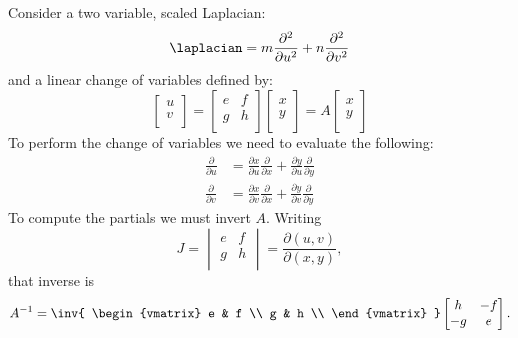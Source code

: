 Consider a two variable, scaled Laplacian:
%
\begin{equation}
\laplacian = m \frac{\partial^2}{\partial u^2} + n \frac{\partial^2}{\partial v^2}
\end{equation}
%
and a linear change of variables defined by:
%
\begin{equation}
\begin{bmatrix}
u \\
v \\
\end{bmatrix}
=
\begin{bmatrix}
e & f \\
g & h \\
\end{bmatrix}
\begin{bmatrix}
x \\
y \\
\end{bmatrix}
=
A
\begin{bmatrix}
x \\
y \\
\end{bmatrix}
\end{equation}
%
To perform the change of variables we need to evaluate the following:
%
\begin{equation}\label{eqn:lorentz:260}
\begin{aligned}
\frac{\partial}{\partial u}
&= \frac{\partial x}{\partial u} \frac{\partial}{\partial x} + \frac{\partial y}{\partial u} \frac{\partial}{\partial y} \\
\frac{\partial}{\partial v}
&= \frac{\partial x}{\partial v} \frac{\partial}{\partial x} + \frac{\partial y}{\partial v} \frac{\partial}{\partial y}
\end{aligned}
\end{equation}
%
To compute the partials we must invert \(A\).  Writing
%
\begin{equation}\label{eqn:lorentz:40}
J =
\begin{vmatrix}
e & f \\
g & h \\
\end{vmatrix}
=
\frac{\partial(u,v)}{\partial(x,y)},
\end{equation}
%
that inverse is
%
\begin{equation}\label{eqn:lorentz:60}
A^{-1} =
\inv
{
\begin{vmatrix}
e & f \\
g & h \\
\end{vmatrix}
}
\begin{bmatrix}
h & -f \\
-g & e \\
\end{bmatrix}.
\end{equation}
